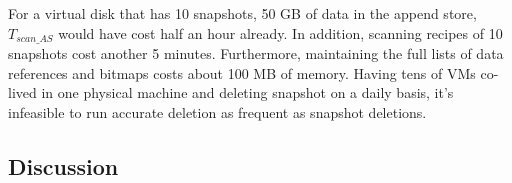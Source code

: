 For a virtual disk that has 10 snapshots, 50 GB of data in the append store, $T_{scan\_AS}$ would have cost half an hour already.
In addition, scanning recipes of 10 snapshots cost another 5 minutes.
Furthermore, maintaining the full lists of data references and bitmaps costs about 100 MB of memory. Having tens of VMs
co-lived in one physical machine and deleting snapshot on a daily basis, 
it's infeasible to run accurate deletion as frequent as snapshot deletions.

\subsection{Discussion}
